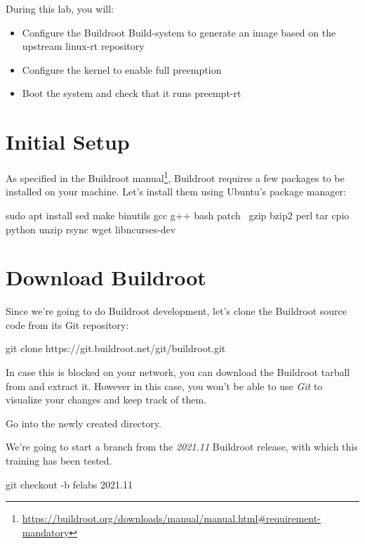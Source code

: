 
During this lab, you will:
\begin{itemize}
	\item Configure the Buildroot Build-system to generate an image based on the upstream linux-rt repository
	\item Configure the kernel to enable full preemption
	\item Boot the system and check that it runs preempt-rt
\end{itemize}

\section{Initial Setup}
As specified in the Buildroot
manual\footnote{\url{https://buildroot.org/downloads/manual/manual.html\#requirement-mandatory}},
Buildroot requires a few packages to be installed on your
machine. Let's install them using Ubuntu's package manager:

\begin{bashinput}
sudo apt install sed make binutils gcc g++ bash patch \
  gzip bzip2 perl tar cpio python unzip rsync wget libncurses-dev
\end{bashinput}

\section{Download Buildroot}

Since we're going to do Buildroot development, let's clone the
Buildroot source code from its Git repository:

\begin{bashinput}
git clone https://git.buildroot.net/git/buildroot.git
\end{bashinput}

In case this is blocked on your network, you can download the Buildroot
tarball \code{buildroot-2021.11.tar.bz2} from
 and extract it. However in this
case, you won't be able to use {\em Git} to visualize your changes and
keep track of them.

Go into the newly created  directory.

We're going to start a branch from the {\em 2021.11} Buildroot
release, with which this training has been tested.

\begin{bashinput}
git checkout -b felabs 2021.11
\end{bashinput}

